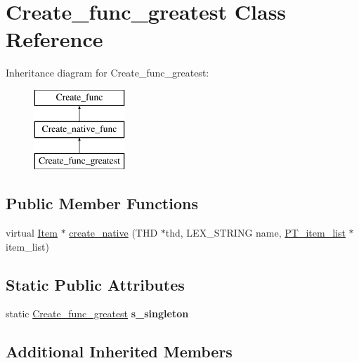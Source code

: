 \hypertarget{classCreate__func__greatest}{}\section{Create\+\_\+func\+\_\+greatest Class Reference}
\label{classCreate__func__greatest}
Inheritance diagram for Create\+\_\+func\+\_\+greatest\+:\begin{figure}[H]
\begin{center}
\leavevmode
\includegraphics[height=3.000000cm]{classCreate__func__greatest}
\end{center}
\end{figure}
\subsection*{Public Member Functions}
\begin{DoxyCompactItemize}
\item 
virtual \mbox{\hyperlink{classItem}{Item}} $\ast$ \mbox{\hyperlink{classCreate__func__greatest_a29348f80d1e11fb8aaeb7da4735ad29e}{create\+\_\+native}} (T\+HD $\ast$thd, L\+E\+X\+\_\+\+S\+T\+R\+I\+NG name, \mbox{\hyperlink{classPT__item__list}{P\+T\+\_\+item\+\_\+list}} $\ast$item\+\_\+list)
\end{DoxyCompactItemize}
\subsection*{Static Public Attributes}
\begin{DoxyCompactItemize}
\item 
\mbox{\label{classCreate__func__greatest_a1d90ea8e2aa0bf142c7cd559f839acae}} 
static \mbox{\hyperlink{classCreate__func__greatest}{Create\+\_\+func\+\_\+greatest}} {\bfseries s\+\_\+singleton}
\end{DoxyCompactItemize}
\subsection*{Additional Inherited Members}


